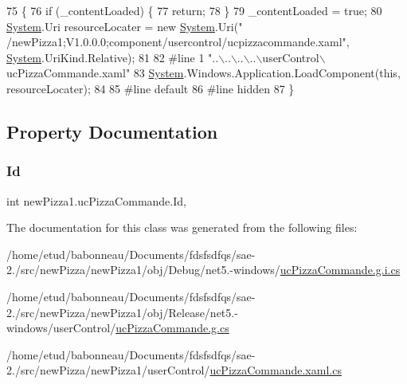 \begin{DoxyCode}
75                                           \{
76             \textcolor{keywordflow}{if} (\_contentLoaded) \{
77                 \textcolor{keywordflow}{return};
78             \}
79             \_contentLoaded = \textcolor{keyword}{true};
80             \hyperlink{namespaceSystem}{System}.Uri resourceLocater = \textcolor{keyword}{new} \hyperlink{namespaceSystem}{System}.Uri(\textcolor{stringliteral}{"
      /newPizza1;V1.0.0.0;component/usercontrol/ucpizzacommande.xaml"}, \hyperlink{namespaceSystem}{System}.UriKind.Relative);
81             
82 \textcolor{preprocessor}{            #line 1 "..\(\backslash\)..\(\backslash\)..\(\backslash\)..\(\backslash\)userControl\(\backslash\)ucPizzaCommande.xaml"
}
83             \hyperlink{namespaceSystem}{System}.Windows.Application.LoadComponent(\textcolor{keyword}{this}, resourceLocater);
84             
85 \textcolor{preprocessor}{            #line default
}
86 \textcolor{preprocessor}{            #line hidden
}
87         \}
\end{DoxyCode}


\subsection{Property Documentation}
\mbox{\label{classnewPizza1_1_1ucPizzaCommande_afe0ddbd6aba3c755b201101b7097344a}} 
\subsubsection{\texorpdfstring{Id}{Id}}
{\footnotesize\ttfamily int new\+Pizza1.\+uc\+Pizza\+Commande.\+Id\hspace{0.3cm}{\ttfamily [get]}, {\ttfamily [set]}}



The documentation for this class was generated from the following files\+:\begin{DoxyCompactItemize}
\item 
/home/etud/babonneau/\+Documents/fdsfsdfqs/sae-\/2./src/new\+Pizza/new\+Pizza1/obj/\+Debug/net5.-\/windows/\hyperlink{net5_80-windows_2ucPizzaCommande_8g_8i_8cs}{uc\+Pizza\+Commande.\+g.\+i.\+cs}\item 
/home/etud/babonneau/\+Documents/fdsfsdfqs/sae-\/2./src/new\+Pizza/new\+Pizza1/obj/\+Release/net5.-\/windows/user\+Control/\hyperlink{ucPizzaCommande_8g_8cs}{uc\+Pizza\+Commande.\+g.\+cs}\item 
/home/etud/babonneau/\+Documents/fdsfsdfqs/sae-\/2./src/new\+Pizza/new\+Pizza1/user\+Control/\hyperlink{ucPizzaCommande_8xaml_8cs}{uc\+Pizza\+Commande.\+xaml.\+cs}\end{DoxyCompactItemize}
